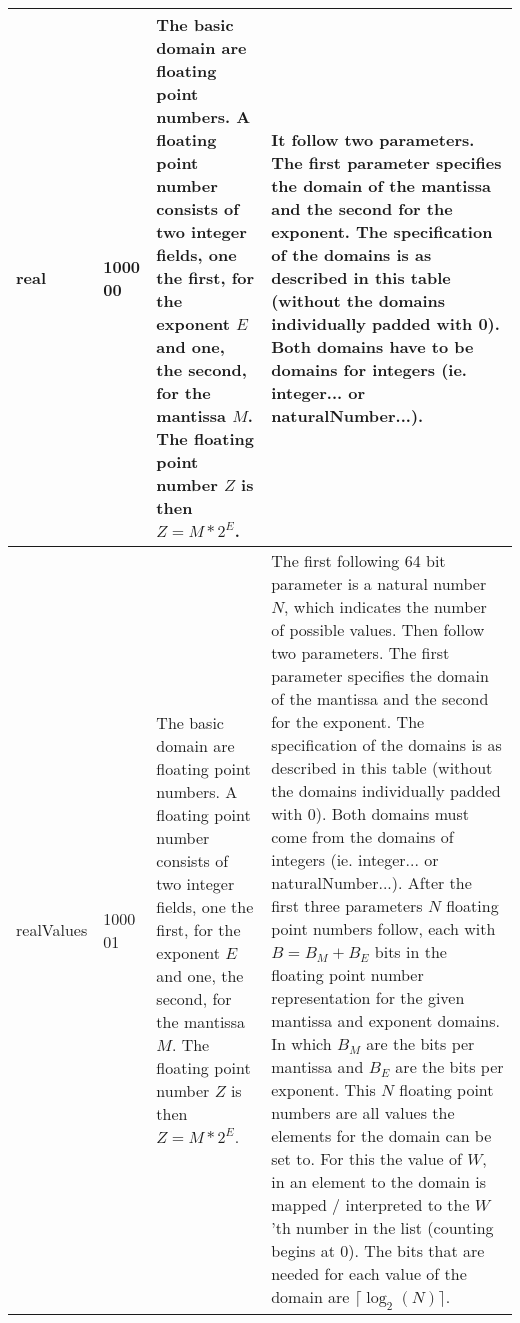 \begin{center}
\begin{longtable}{|p{25mm}|p{15mm}|p{25mm}|p{60mm}|}
	real & 1000 00 & The basic domain are floating point numbers. A floating point number consists of two integer fields, one the first, for the exponent $E$ and one, the second, for the mantissa $M$. The floating point number $Z$ is then $Z = M * 2^E$. & It follow two parameters. The first parameter specifies the domain of the mantissa and the second for the exponent. The specification of the domains is as described in this table (without the domains individually padded with 0). Both domains have to be domains for integers (ie. integer... or naturalNumber...).\\\hline
	realValues & 1000 01 & The basic domain are floating point numbers. A floating point number consists of two integer fields, one the first, for the exponent $E$ and one, the second, for the mantissa $M$. The floating point number $Z$ is then $Z = M * 2^E$. & The first following 64 bit parameter is a natural number $N$, which indicates the number of possible values. Then follow two parameters. The first parameter specifies the domain of the mantissa and the second for the exponent. The specification of the domains is as described in this table (without the domains individually padded with 0). Both domains must come from the domains of integers (ie. integer... or naturalNumber...). After the first three parameters $N$ floating point numbers follow, each with $B=B_M+B_E$ bits in the floating point number representation for the given mantissa and exponent domains. In which $B_M$ are the bits per mantissa and $B_E$ are the bits per exponent. This $N$ floating point numbers are all values the elements for the domain can be set to. For this the value of $W$, in an element to the domain is mapped / interpreted to the $W$'th number in the list (counting begins at 0). The bits that are needed for each value of the domain are $\lceil \log_2(N) \rceil $.\\\hline


\end{longtable}
\end{center}
